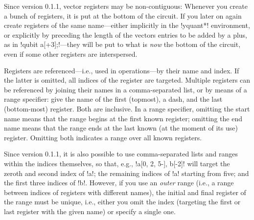 \documentclass{scrartcl}
\begin{document}
         Since version 0.1.1, vector registers may be non\hyp contiguous: Whenever you create a bunch of registers, it is put at the bottom of the circuit.
         If you later on again create registers of the same name---either implicitly in the \tex!yquant*! environment, or explicitly by preceding the length of the vectors entries to be added by a plus, as in \yquant!qubit a[+3];!---they will be put to what is \emph{now} the bottom of the circuit, even if some other registers are interspersed.
         
         Registers are referenced---i.e., used in operations---by their name and index.
         If the latter is omitted, all indices of the register are targeted.
         Multiple registers can be referenced by joining their names in a comma\hyp separated list, or by means of a range specifier: give the name of the first (topmost), a dash, and the last (bottom\hyp most) register.
         Both are inclusive.
         In a range specifier, omitting the start name means that the range begins at the first known register; omitting the end name means that the range ends at the last known (at the moment of its use) register.
         Omitting both indicates a range over all known registers.
         
         Since version 0.1.1, it is also possible to use comma\hyp separated lists and ranges within the indices themselves, so that, e.g., \yquant!a[0, 2, 5-], b[-2]! will target the zeroth and second index of \yquant!a!; the remaining indices of \yquant!a! starting from five; and the first three indices of \yquant!b!.
         However, if you use an \emph{outer} range (i.e., a range between indices of registers with different names), the initial and final register of the range must be unique, i.e., either you omit the index (targeting the first or last register with the given name) or specify a single one.
         
\end{document}
